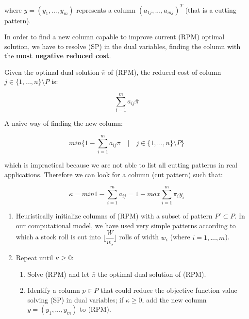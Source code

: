 \documentclass[10pt,a4paper]{article}
\begin{document}
where $y = (y_1,...,y_m)$ represents a column $(a_{1j},...,a_{mj})^T$ (that is a cutting pattern).

In order to find a new column capable to improve current (RPM) optimal solution, we have to resolve (SP) in the dual variables, finding the column with the \textbf{most negative reduced cost}. 

Given the optimal dual solution $\bar{\pi}$ of (RPM), the reduced cost of column $j \in \lbrace 1,...,n \rbrace \setminus P$ is:

\begin{equation}
\sum_{i=1}^m a_{ij} \bar{\pi}
\end{equation}

A naive way of finding the new column:

\begin{equation}
min \lbrace 1 - \sum_{i=1}^m a_{ij} \bar{\pi} \quad \vert \quad j \in \lbrace 1,...,n \rbrace \setminus P \rbrace
\end{equation}

which is impractical because we are not able to list all cutting patterns in real applications. Therefore we can look for a column (cut pattern) such that:

\begin{equation}
\kappa = min 1 - \sum_{i=1}^m a_{ij} = 1 - max \sum_{i = 1}^{m} \pi_i y_i
\end{equation}

 







\begin{enumerate}
\item Heuristically initialize columns of (RPM) with a subset of pattern $P' \subset P$. In our computational model, we have used very simple patterns according to which a stock roll is cut into $\lfloor \dfrac{W}{w_i}\rfloor$ rolls of width $w_i$ (where $i = 1,...,m$). 

\item Repeat until $\kappa \geq 0$:

\begin{enumerate}
\item Solve (RPM) and let $\bar{\pi}$  the optimal dual solution of (RPM).
\item Identify a column $p \in P$ that could reduce the objective function value solving (SP) in dual variables; if $\kappa \geq 0$, add the new column $y = (y_1,...,y_m)$ to (RPM). 
\end{enumerate}

\end{enumerate}
\end{document}
